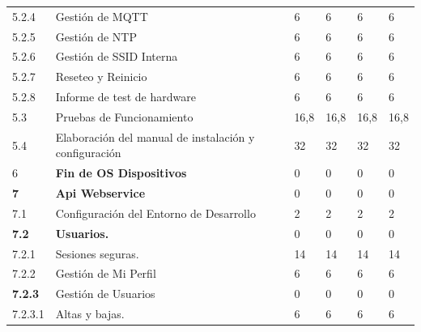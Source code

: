 \documentclass[11pt]{charter}
\begin{document}
\begin{landscape}
\begin{tabularx}{\linewidth}{@{}|p{2cm}|p{11cm}|p{2.4cm}|p{2.4cm}|p{2.4cm}|p{2.4cm}|@{}}
5.2.4          & Gestión de MQTT                                                                               & 6    & 6    & 6    & 6    \\
5.2.5          & Gestión de NTP                                                                                & 6    & 6    & 6    & 6    \\
5.2.6          & Gestión de SSID Interna                                                                       & 6    & 6    & 6    & 6    \\
5.2.7          & Reseteo y Reinicio                                                                            & 6    & 6    & 6    & 6    \\
5.2.8          & Informe de test de hardware                                                                   & 6    & 6    & 6    & 6    \\
5.3            & Pruebas de Funcionamiento                                                                     & 16,8 & 16,8 & 16,8 & 16,8 \\
5.4            & Elaboración del manual de   instalación y configuración                                       & 32   & 32   & 32   & 32   \\
6              & \textbf{Fin de OS Dispositivos}                                                               & 0    & 0    & 0    & 0    \\
\textbf{7}     & \textbf{Api Webservice}                                                                       & 0    & 0    & 0    & 0    \\
7.1            & Configuración del Entorno de   Desarrollo                                                     & 2    & 2    & 2    & 2    \\
\textbf{7.2}   & \textbf{Usuarios.}                                                                            & 0    & 0    & 0    & 0    \\
7.2.1          & Sesiones seguras.                                                                             & 14   & 14   & 14   & 14   \\
7.2.2          & Gestión de Mi Perfil                                                                          & 6    & 6    & 6    & 6    \\
\textbf{7.2.3} & Gestión de Usuarios                                                                           & 0    & 0    & 0    & 0    \\
7.2.3.1        & Altas y bajas.                                                                                & 6    & 6    & 6    & 6    \\

\end{tabularx}
\end{landscape}
\end{document}
